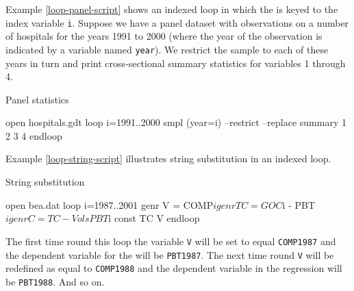 Example \ref{loop-panel-script} shows an indexed loop in which the
 is keyed to the index variable \verb+i+.  Suppose we have a
panel dataset with observations on a number of hospitals for the years
1991 to 2000 (where the year of the observation is indicated by a
variable named \verb+year+).  We restrict the sample to each of these
years in turn and print cross-sectional summary statistics for
variables 1 through 4.

\begin{script}[htbp]
  \caption{Panel statistics}
  \label{loop-panel-script}
\begin{scode}
open hospitals.gdt
loop i=1991..2000
  smpl (year=i) --restrict --replace
  summary 1 2 3 4
endloop
\end{scode}
\end{script}


Example \ref{loop-string-script} illustrates string substitution in an
indexed loop.

\begin{script}[htbp]
  \caption{String substitution}
  \label{loop-string-script}
\begin{scode}
open bea.dat
loop i=1987..2001
  genr V = COMP$i
  genr TC = GOC$i - PBT$i
  genr C = TC - V
  ols PBT$i const TC V
endloop
\end{scode}
\end{script}

The first time round this loop the variable \verb+V+ will be set to
equal \verb+COMP1987+ and the dependent variable for the 
will be \verb+PBT1987+. The next time round \verb+V+ will be redefined
as equal to \verb+COMP1988+ and the dependent variable in the
regression will be \verb+PBT1988+.  And so on.


